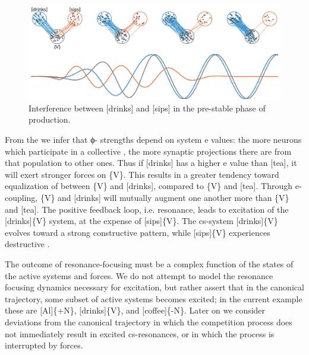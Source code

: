   
\begin{figure}
\includegraphics[width=\textwidth]{figures/Tilsen-img52.png}
\caption{Interference between [drinks] and [sips] in the pre-stable phase of production.}
\label{fig:4:2}
\end{figure}
 

  From the  we infer that ϕ{}- strengths depend on system e values: the more neurons which participate in a collective , the more synaptic projections there are from that population to other ones. Thus if [drinks] has a higher e value than [tea], it will exert stronger forces on \{V\}. This results in a greater tendency toward equalization of  between \{V\} and [drinks], compared to \{V\} and [tea]. Through e-coupling, \{V\} and [drinks] will mutually augment one another more than \{V\} and [tea]. The positive feedback loop, i.e. resonance, leads to excitation of the [drinks]\{V\} system, at the expense of [sips]\{V\}. The cs-system [drinks]\{V\} evolves toward a strong constructive  pattern, while [sips]\{V\} experiences destructive .

  The outcome of resonance-focusing must be a complex function of the states of the active systems and  forces. We do not attempt to model the resonance focusing dynamics necessary for excitation, but rather assert that in the canonical trajectory, some subset of active systems becomes excited; in the current example these are [Al]\{+N\}, [drinks]\{V\}, and [coffee]\{-N\}. Later on we consider deviations from the canonical trajectory in which the competition process does not immediately result in excited cs-resonances, or in which the process is interrupted by  forces.

